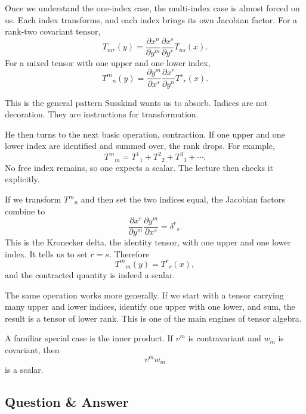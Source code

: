 Once we understand the one-index case, the multi-index case is almost forced on us. Each index transforms, and each index brings its own Jacobian factor. For a rank-two covariant tensor,
\begin{equation}
T_{mr}(y)=
\frac{\partial x^n}{\partial y^m}
\frac{\partial x^s}{\partial y^r}
T_{ns}(x).
\end{equation}
For a mixed tensor with one upper and one lower index,
\begin{equation}
T^m{}_{n}(y)=
\frac{\partial y^m}{\partial x^s}
\frac{\partial x^r}{\partial y^n}
T^s{}_{r}(x).
\end{equation}

This is the general pattern Susskind wants us to absorb. Indices are not decoration. They are instructions for transformation.

He then turns to the next basic operation, contraction. If one upper and one lower index are identified and summed over, the rank drops. For example,
\begin{equation}
T^m{}_{m}=T^1{}_{1}+T^2{}_{2}+T^3{}_{3}+\cdots.
\end{equation}
No free index remains, so one expects a scalar. The lecture then checks it explicitly.

If we transform \(T^m{}_{n}\) and then set the two indices equal, the Jacobian factors combine to
\begin{equation}
\frac{\partial x^r}{\partial y^m}
\frac{\partial y^m}{\partial x^s}
=
\delta^r{}_{s}.
\end{equation}
This is the Kronecker delta, the identity tensor, with one upper and one lower index. It tells us to set \(r=s\). Therefore
\begin{equation}
T^m{}_{m}(y)=T^r{}_{r}(x),
\end{equation}
and the contracted quantity is indeed a scalar.

The same operation works more generally. If we start with a tensor carrying many upper and lower indices, identify one upper with one lower, and sum, the result is a tensor of lower rank. This is one of the main engines of tensor algebra.

A familiar special case is the inner product. If \(v^m\) is contravariant and \(w_m\) is covariant, then
\begin{equation}
v^m w_m
\end{equation}
is a scalar.

\subsection{Question \& Answer}

